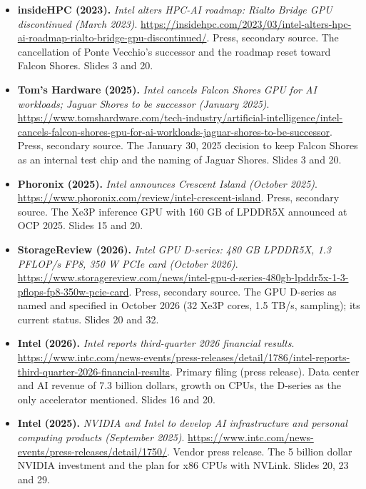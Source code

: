 \begin{itemize}[leftmargin=1.2em,itemsep=3pt]
\item \textbf{insideHPC (2023).} \textit{Intel alters HPC-AI roadmap: Rialto Bridge GPU discontinued (March 2023)}. \url{https://insidehpc.com/2023/03/intel-alters-hpc-ai-roadmap-rialto-bridge-gpu-discontinued/}. Press, secondary source. The cancellation of Ponte Vecchio's successor and the roadmap reset toward Falcon Shores. Slides 3 and 20.
\item \textbf{Tom's Hardware (2025).} \textit{Intel cancels Falcon Shores GPU for AI workloads; Jaguar Shores to be successor (January 2025)}. \url{https://www.tomshardware.com/tech-industry/artificial-intelligence/intel-cancels-falcon-shores-gpu-for-ai-workloads-jaguar-shores-to-be-successor}. Press, secondary source. The January 30, 2025 decision to keep Falcon Shores as an internal test chip and the naming of Jaguar Shores. Slides 3 and 20.
\item \textbf{Phoronix (2025).} \textit{Intel announces Crescent Island (October 2025)}. \url{https://www.phoronix.com/review/intel-crescent-island}. Press, secondary source. The Xe3P inference GPU with 160 GB of LPDDR5X announced at OCP 2025. Slides 15 and 20.
\item \textbf{StorageReview (2026).} \textit{Intel GPU D-series: 480 GB LPDDR5X, 1.3 PFLOP/s FP8, 350 W PCIe card (October 2026)}. \url{https://www.storagereview.com/news/intel-gpu-d-series-480gb-lpddr5x-1-3-pflops-fp8-350w-pcie-card}. Press, secondary source. The GPU D-series as named and specified in October 2026 (32 Xe3P cores, 1.5 TB/s, sampling); its current status. Slides 20 and 32.
\item \textbf{Intel (2026).} \textit{Intel reports third-quarter 2026 financial results}. \url{https://www.intc.com/news-events/press-releases/detail/1786/intel-reports-third-quarter-2026-financial-results}. Primary filing (press release). Data center and AI revenue of 7.3 billion dollars, growth on CPUs, the D-series as the only accelerator mentioned. Slides 16 and 20.
\item \textbf{Intel (2025).} \textit{NVIDIA and Intel to develop AI infrastructure and personal computing products (September 2025)}. \url{https://www.intc.com/news-events/press-releases/detail/1750/}. Vendor press release. The 5 billion dollar NVIDIA investment and the plan for x86 CPUs with NVLink. Slides 20, 23 and 29.
\end{itemize}
